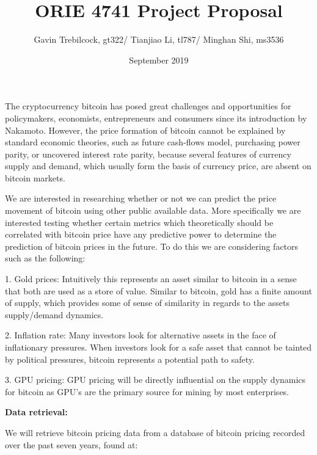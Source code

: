 \documentclass[12pt]{extarticle}
\title{ORIE 4741 Project Proposal}
\author{Gavin Trebilcock, gt322/ Tianjiao Li, tl787/ Minghan Shi, ms3536}
\date{September 2019}
\begin{document}
\maketitle


The cryptocurrency bitcoin has posed great challenges and opportunities for  policymakers, economists, entrepreneurs and consumers since its introduction by Nakamoto\cite{dyhrberg2016hedging}. However, the price formation of bitcoin cannot be explained by standard economic theories, such as future cash-flows model, purchasing power parity, or uncovered interest rate parity, because several features of currency supply and demand, which usually form the basis of currency price, are absent on bitcoin markets\cite{ciaian2016economics}.

We are interested in researching whether or not we can predict the price movement of bitcoin using other public available data. More specifically we are interested testing whether certain metrics which theoretically should be correlated with bitcoin price have any predictive power to determine the prediction of bitcoin prices in the future. To do this we are considering factors such as the following:

1. Gold prices: Intuitively this represents an asset similar to bitcoin in a sense that both are used as a store of value. Similar to bitcoin, gold has a finite amount of supply, which provides some of sense of similarity in regards to the assets supply/demand dynamics.

2. Inflation rate: Many investors look for alternative assets in the face of inflationary pressures. When investors look for a safe asset that cannot be tainted by political pressures, bitcoin represents a potential path to safety.

3. GPU pricing: GPU pricing will be directly influential on the supply dynamics for bitcoin as GPU's are the primary source for mining by most enterprises.




\clearpage

\noindent \textbf{Data retrieval:}

We will retrieve bitcoin pricing data from a database of bitcoin pricing recorded over the past seven years, found at:
\end{document}
